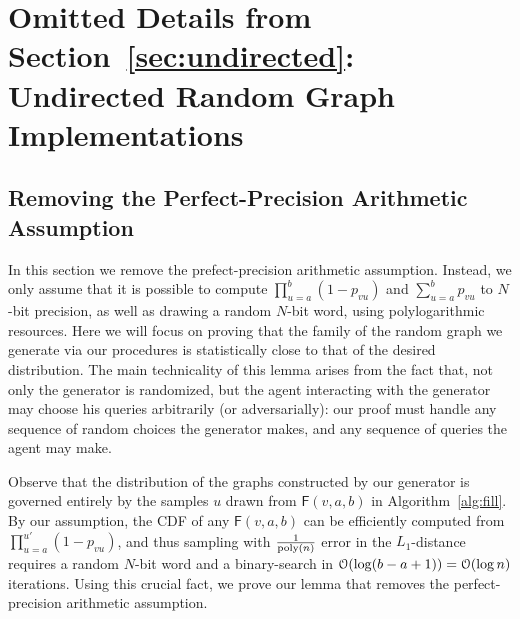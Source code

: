 \section{Omitted Details from Section~\ref{sec:undirected}: Undirected Random Graph Implementations}
\label{sec:undirected_omitted}


\subsection{Removing the Perfect-Precision Arithmetic Assumption}
\label{sec:remove-perfect}

In this section we remove the prefect-precision arithmetic assumption. Instead, we only assume that it is possible to compute $\prod_{u=a}^b (1-p_{vu})$ and $\sum_{u=a}^b p_{vu}$ to $N$-bit precision, as well as drawing a random $N$-bit word, using polylogarithmic resources. Here we will focus on proving that the family of the random graph we generate via our procedures is statistically close to that of the desired distribution. The main technicality of this lemma arises from the fact that, not only the generator is randomized, but the agent interacting with the generator may choose his queries arbitrarily (or adversarially): our proof must handle any sequence of random choices the generator makes, and any sequence of queries the agent may make.

Observe that the distribution of the graphs constructed by our generator is governed entirely by the samples $u$ drawn from $\mathsf{F}(v,a,b)$ in Algorithm~\ref{alg:fill}. By our assumption, the CDF of any $\mathsf{F}(v,a,b)$ can be efficiently computed from $\prod_{u=a}^{u'} (1-p_{vu})$, and thus sampling with $\frac{1}{\mathrm{poly}(n)}$ error in the $L_1$-distance requires a random $N$-bit word and a binary-search in $\mathcal{O}(\log (b-a+1)) = \mathcal{O}(\log n)$ iterations. Using this crucial fact, we prove our lemma that removes the perfect-precision arithmetic assumption.


